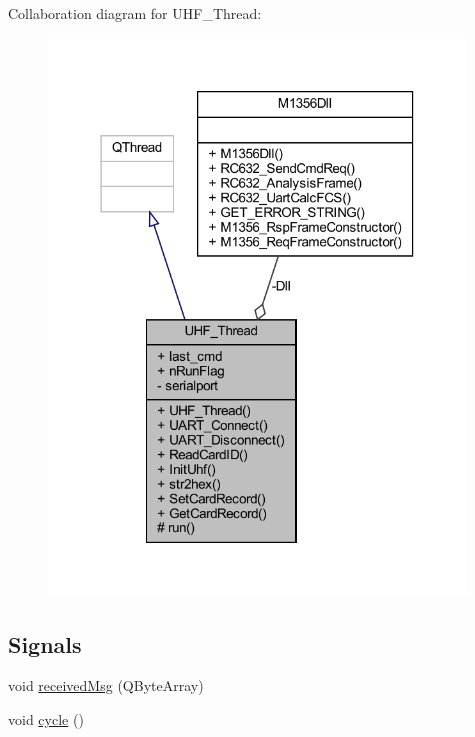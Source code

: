 Collaboration diagram for U\+H\+F\+\_\+\+Thread\+:
\nopagebreak
\begin{figure}[H]
\begin{center}
\leavevmode
\includegraphics[width=314pt]{class_u_h_f___thread__coll__graph}
\end{center}
\end{figure}
\subsection*{Signals}
\begin{DoxyCompactItemize}
\item 
void \mbox{\hyperlink{class_u_h_f___thread_aa3b7dd0bbada4349d59821aab8a17927}{received\+Msg}} (Q\+Byte\+Array)
\item 
void \mbox{\hyperlink{class_u_h_f___thread_a232f1c855e0b835beebcdb4a6b6a4484}{cycle}} ()
\end{DoxyCompactItemize}
